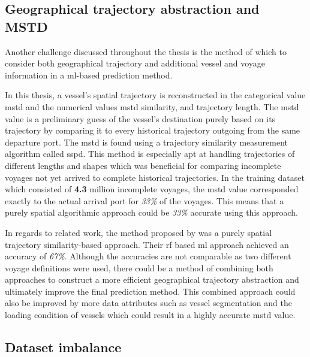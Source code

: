 \subsection{Geographical trajectory abstraction and MSTD}

Another challenge discussed throughout the thesis is the method of which to consider both geographical trajectory and additional vessel and voyage information in a \acrfull{ml}-based prediction method.

In this thesis, a vessel's spatial trajectory is reconstructed in the categorical value \acrfull{mstd} and the numerical values \acrshort{mstd} similarity, and trajectory length. The \acrshort{mstd} value is a preliminary guess of the vessel's destination purely based on its trajectory by comparing it to every historical trajectory outgoing from the same departure port. The \acrshort{mstd} is found using a trajectory similarity measurement algorithm called \acrfull{sspd}. This method is especially apt at handling trajectories of different lengths and shapes which was beneficial for comparing incomplete voyages not yet arrived to complete historical trajectories. In the training dataset which consisted of \textbf{4.3} million incomplete voyages, the \acrshort{mstd} value corresponded exactly to the actual arrival port for \textit{33\%} of the voyages. This means that a purely spatial algorithmic approach could be \textit{33\%} accurate using this approach.

In regards to related work, the method proposed by \cite{Zhang2020AISApproach} was a purely spatial trajectory similarity-based approach. Their \acrfull{rf} based \acrshort{ml} approach achieved an accuracy of \textit{67\%}. Although the accuracies are not comparable as two different voyage definitions were used, there could be a method of combining both approaches to construct a more efficient geographical trajectory abstraction and ultimately improve the final prediction method. This combined approach could also be improved by more data attributes such as vessel segmentation and the loading condition of vessels which could result in a highly accurate \acrshort{mstd} value.

\subsection{Dataset imbalance}

